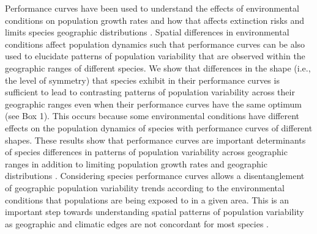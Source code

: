 Performance curves have been used to understand the effects of environmental conditions on population growth rates and how that affects extinction risks and limits species geographic distributions \parencite{buckley2008, angilletta2009}. Spatial differences in environmental conditions affect population dynamics such that performance curves can be also used to elucidate patterns of population variability that are observed within the geographic ranges of different species. We show that differences in the shape (i.e., the level of symmetry)  that species exhibit in their performance curves \parencite{buckley2022} is sufficient to lead to contrasting patterns of population variability across their geographic ranges even when their performance curves have the same optimum (see Box 1). This occurs because some environmental conditions have different effects on the population dynamics of species with performance curves of different shapes. These results show that performance curves are important determinants of species differences in patterns of population variability across geographic ranges in addition to limiting population growth rates and geographic distributions \parencite{buckley2008, angilletta2009}. Considering species performance curves allows a disentanglement of geographic population variability trends according to the environmental conditions that populations are being exposed to in a given area. This is an important step towards understanding spatial patterns of population variability as geographic and climatic edges are not concordant for most species \parencite{oldfather2019,pennington2021}. 
 

